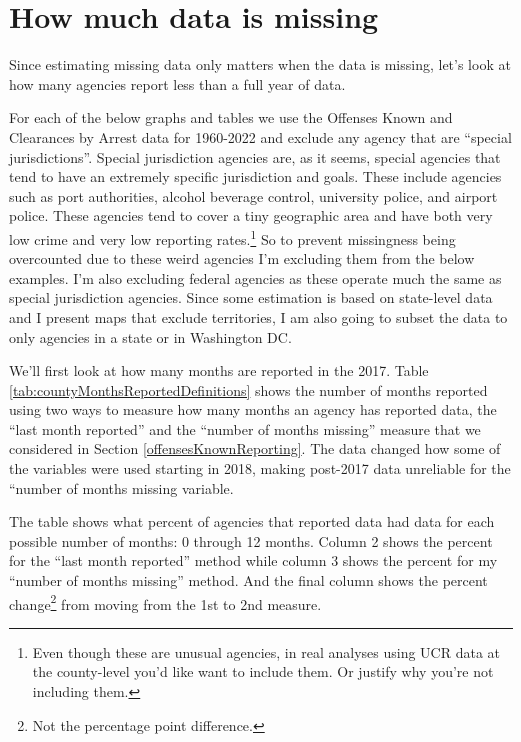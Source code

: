 \documentclass[
  12pt,
  openany]{book}
\begin{document}
\section{How much data is missing}\label{how-much-data-is-missing}

Since estimating missing data only matters when the data is missing, let's look at how many agencies report less than a full year of data.

For each of the below graphs and tables we use the Offenses Known and Clearances by Arrest data for 1960-2022 and exclude any agency that are ``special jurisdictions''. Special jurisdiction agencies are, as it seems, special agencies that tend to have an extremely specific jurisdiction and goals. These include agencies such as port authorities, alcohol beverage control, university police, and airport police. These agencies tend to cover a tiny geographic area and have both very low crime and very low reporting rates.\footnote{Even though these are unusual agencies, in real analyses using UCR data at the county-level you'd like want to include them. Or justify why you're not including them.} So to prevent missingness being overcounted due to these weird agencies I'm excluding them from the below examples. I'm also excluding federal agencies as these operate much the same as special jurisdiction agencies. Since some estimation is based on state-level data and I present maps that exclude territories, I am also going to subset the data to only agencies in a state or in Washington DC.

We'll first look at how many months are reported in the 2017. Table \ref{tab:countyMonthsReportedDefinitions} shows the number of months reported using two ways to measure how many months an agency has reported data, the ``last month reported'' and the ``number of months missing'' measure that we considered in Section \ref{offensesKnownReporting}. The data changed how some of the variables were used starting in 2018, making post-2017 data unreliable for the ``number of months missing variable.

The table shows what percent of agencies that reported data had data for each possible number of months: 0 through 12 months. Column 2 shows the percent for the ``last month reported'' method while column 3 shows the percent for my ``number of months missing'' method. And the final column shows the percent change\footnote{Not the percentage point difference.} from moving from the 1st to 2nd measure.
\end{document}
